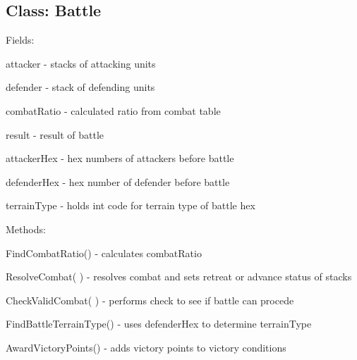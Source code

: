 \subsection*{Class:  Battle}
\begin{al}
	\item[Fields:]\parbox{\textwidth}{attacker - stacks of attacking units}
    \item[] \parbox{\textwidth}{defender - stack of defending units}
    \item[] \parbox{\textwidth}{combatRatio  - calculated ratio from combat table }
    \item[] \parbox{\textwidth}{result - result of battle}
    \item[] \parbox{\textwidth}{attackerHex - hex numbers of attackers before battle}
    \item[] \parbox{\textwidth}{defenderHex - hex number of defender before battle}
    \item[] \parbox{\textwidth}{terrainType - holds int code for terrain type of battle hex}
	\item[Methods:]\parbox{\textwidth}{FindCombatRatio() - calculates combatRatio}
    \item[] \parbox{\textwidth}{\parbox{\textwidth}{ResolveCombat( ) - resolves combat and sets retreat or advance status of stacks}}
    \item[] \parbox{\textwidth}{CheckValidCombat( ) - performs check to see if battle can procede}
    \item[] \parbox{\textwidth}{FindBattleTerrainType() - uses defenderHex to determine terrainType}
    \item[] \parbox{\textwidth}{AwardVictoryPoints() - adds victory points to victory conditions}
\end{al}
